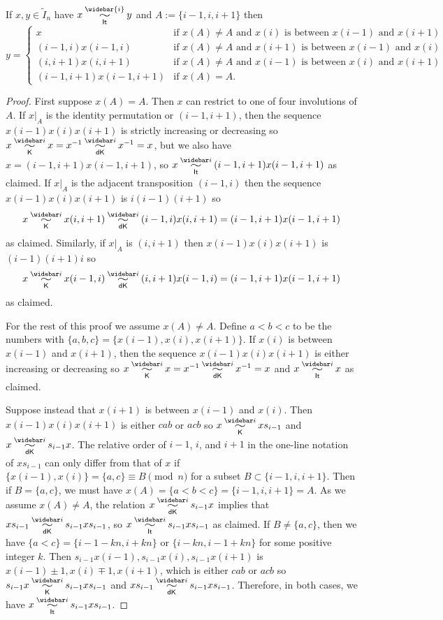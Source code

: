 \documentclass[11pt]{article}
\begin{document}
\begin{theorem}\label{direct-prop} 
If $x,y\in \tilde{I}_n$ have $x\simRBS{\widebar{i}}y$   and 
$A:=\{i-1,i,i+1\}$ then
\[
y = \begin{cases} x &\text{if $x(A) \neq A$ and $x(i)$ is between $x(i-1)$ and $x(i+1)$}
\\
 (i-1,i)x (i-1,i) &\text{if $x(A) \neq A$ and $x(i+1)$ is between $x(i-1)$ and $x(i)$}
\\
(i,i+1)x (i,i+1) &\text{if $x(A) \neq A$ and $x(i-1)$ is between $x(i)$ and $x(i+1)$ }
\\
 (i-1,i+1)x(i-1,i+1) &\text{if $x(A) = A$}.
\end{cases}
\]
\end{theorem}
\begin{proof}
First suppose $x(A)=A$. Then $x$ can restrict to one of four involutions of $A$.
 If $x|_A$ is the identity permutation or $(i-1,i+1)$, then the sequence $x(i-1)x(i)x(i+1)$ is strictly increasing or decreasing
 so $x \K{\widebar i} x =x^{-1} \dK{\widebar i} x^{-1} = x$, but we also have $x=(i-1,i+1)x(i-1,i+1)$, so 
  $x\simRBS{\widebar i} (i-1,i+1)x(i-1,i+1)$ as claimed.
 If $x|_A$ is the adjacent transposition $(i-1,i)$ then the sequence $x(i-1)x(i)x(i+1)$ is $i(i-1)(i+1)$
 so 
 \[ x\K{\widebar i} x(i,i+1)  \dK{\widebar i} (i-1,i) x(i,i+1)  = (i-1,i+1)x(i-1,i+1) \]
 as claimed.
 Similarly, if $x|_A$ is $(i,i+1)$ then  $x(i-1)x(i)x(i+1)$ is  $(i-1)(i+1)i$ so 
 \[ x\K{\widebar i}x(i-1,i)\dK{\widebar i}(i,i+1)x(i-1,i)= (i-1,i+1)x(i-1,i+1) \]
 as claimed.

For the rest of this proof we assume   $x(A)\neq A$. Define $a<b<c$ to be the numbers with $\{a,b,c\} = \{x(i-1),x(i),x(i+1)\}$.
If $x(i)$ is between $x(i-1)$ and $x(i+1)$, then the sequence $x(i-1)x(i)x(i+1)$ is either increasing or decreasing so $x\K{\widebar i}x= x^{-1} \dK{\widebar i} x^{-1} =x$ and $x\simRBS{\widebar i} x$ as claimed.

Suppose instead that $x(i+1)$ is between $x(i-1)$ and $x(i)$.
Then $x(i-1)x(i)x(i+1)$ is either $cab$ or $acb$ so $x\K{\widebar i}xs_{i-1}$ and $x\dK{\widebar i} s_{i-1} x$.
The relative order of $i-1$, $i$, and $i+1$ in the one-line notation of $xs_{i-1}$
 can only differ from that of $x$ if $\{x(i-1),x(i)\} = \{a,c\}\equiv B\pmod{n}$ for a subset $B\subset \{i-1,i,i+1\}$. Then if $B=\{a,c\}$, we must have $x(A) = \{a<b<c\} = \{i-1,i,i+1\}=A$.
As we assume $x(A) \neq A$, 
the relation $x\dK{\widebar i} s_{i-1} x$ implies that $xs_{i-1} \dK{\widebar i} s_{i-1} x s_{i-1}$,
so $x\simRBS{\widebar i} s_{i-1}x s_{i-1}$ as claimed.
If $B\neq\{a,c\}$, then we have $\{a<c\}=\{i-1-kn,i+kn\}$ or $\{i-kn,i-1+kn\}$ for some positive integer $k$. Then $s_{i-1}x(i-1),s_{i-1}x(i),s_{i-1}x(i+1)$ is $x(i-1)\pm1,x(i)\mp1,x(i+1)$, which is either $cab$ or $acb$ so $s_{i-1}x\K{\widebar i}s_{i-1}xs_{i-1}$ and $xs_{i-1}\dK{\widebar i}s_{i-1}xs_{i-1}$. Therefore, in both cases, we have $x\simRBS{\widebar i}s_{i-1}xs_{i-1}$.


\end{proof}
\end{document}
